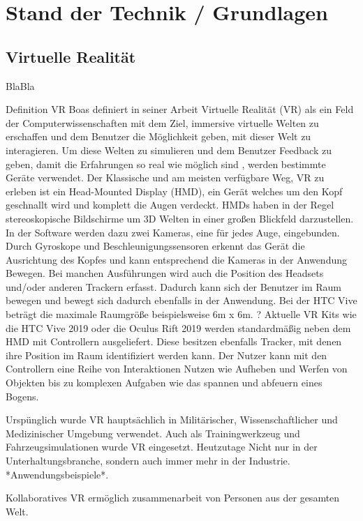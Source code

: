 \chapter{Stand der Technik / Grundlagen}

\section{Virtuelle Realität}
BlaBla\cite{Dummer2009}

Definition VR
Boas definiert in  seiner Arbeit \cite{Boas2012} Virtuelle Realität (VR) als ein Feld der Computerwissenschaften mit dem Ziel, immersive virtuelle Welten zu erschaffen und dem Benutzer die Möglichkeit geben, mit dieser Welt zu interagieren. Um diese Welten zu simulieren und dem Benutzer Feedback zu geben, damit die Erfahrungen so real wie möglich sind , werden bestimmte Geräte verwendet.
Der Klassische und am meisten verfügbare Weg, VR zu erleben ist ein Head-Mounted Display (HMD), ein Gerät welches um den Kopf geschnallt wird und komplett die Augen verdeckt. HMDs haben in der Regel stereoskopische Bildschirme um 3D Welten in einer großen Blickfeld darzustellen. In der Software werden dazu zwei Kameras, eine für jedes Auge, eingebunden. Durch Gyroskope und Beschleunigungssensoren erkennt das Gerät die Ausrichtung des Kopfes und kann entsprechend die Kameras in der Anwendung Bewegen. Bei manchen Ausführungen wird auch die Position des Headsets und/oder anderen Trackern erfasst. Dadurch kann sich der Benutzer im Raum bewegen und bewegt sich dadurch ebenfalls in der Anwendung. \cite{Boas2012}\cite{Holloway1995} Bei der HTC Vive beträgt die maximale Raumgröße beispielsweise 6m x 6m. ?
Aktuelle VR Kits wie die HTC Vive 2019 oder die Oculus Rift 2019 werden standardmäßig neben dem HMD mit Controllern ausgeliefert. Diese besitzen ebenfalls Tracker, mit denen ihre Position im Raum identifiziert werden kann. Der Nutzer kann mit den Controllern eine Reihe von Interaktionen Nutzen wie Aufheben und Werfen von Objekten bis zu komplexen Aufgaben wie das spannen und abfeuern eines Bogens.

Urspünglich wurde VR hauptsächlich in Militärischer, Wissenschaftlicher und Medizinischer Umgebung verwendet. Auch als Trainingwerkzeug und Fahrzeugsimulationen wurde VR eingesetzt. Heutzutage 
 Nicht nur in der Unterhaltungsbranche, sondern auch immer mehr in der Industrie.\cite{Ragan2010} *Anwendungsbeispiele*.
 
Kollaboratives VR ermöglich zusammenarbeit von Personen aus der gesamten Welt.


